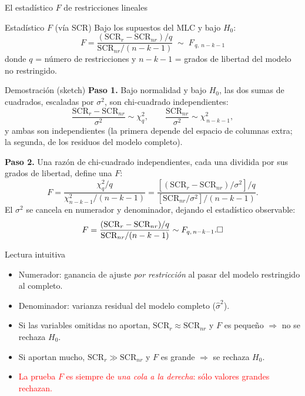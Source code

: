 \documentclass{beamer}
\begin{document}
\begin{frame}[allowframebreaks]{El estadístico $F$ de restricciones lineales}

\begin{alertblock}{Estadístico $F$ (vía SCR)}
Bajo los supuestos del MLC y bajo $H_0$:
\[
\boxed{\,F = \frac{(\text{SCR}_r - \text{SCR}_{nr})/q}{\text{SCR}_{nr}/(n-k-1)} \;\sim\; F_{\,q,\ n-k-1}\,}
\]
donde $q$ = número de restricciones y $n-k-1$ = grados de libertad del modelo no restringido.
\end{alertblock}

\begin{exampleblock}{Demostración (sketch)}
\textbf{Paso 1.} Bajo normalidad y bajo $H_0$, las dos sumas de cuadrados, escaladas por $\sigma^2$, son chi-cuadrado independientes:
\[
\frac{\text{SCR}_r - \text{SCR}_{nr}}{\sigma^2} \sim \chi^2_{q},
\qquad
\frac{\text{SCR}_{nr}}{\sigma^2} \sim \chi^2_{\,n-k-1},
\]
y ambas son independientes (la primera depende del espacio de columnas extra; la segunda, de los residuos del modelo completo).

\framebreak

\textbf{Paso 2.} Una razón de chi-cuadrado independientes, cada una dividida por sus grados de libertad, define una $F$:
\[
F = \frac{\chi^2_q / q}{\chi^2_{n-k-1}/(n-k-1)}
  = \frac{[(\text{SCR}_r - \text{SCR}_{nr})/\sigma^2]/q}{[\text{SCR}_{nr}/\sigma^2]/(n-k-1)} .
\]
El $\sigma^2$ se cancela en numerador y denominador, dejando el estadístico observable:
\[
F = \frac{(\text{SCR}_r - \text{SCR}_{nr})/q}{\text{SCR}_{nr}/(n-k-1)} \sim F_{q,\,n-k-1}.
\hfill \square
\]
\end{exampleblock}

\framebreak

\begin{block}{Lectura intuitiva}
\begin{itemize}
    \item Numerador: ganancia de ajuste \emph{por restricción} al pasar del modelo restringido al completo.
    \item Denominador: varianza residual del modelo completo ($\hat{\sigma}^2$).
    \item Si las variables omitidas no aportan, $\text{SCR}_r \approx \text{SCR}_{nr}$ y $F$ es pequeño $\Rightarrow$ no se rechaza $H_0$.
    \item Si aportan mucho, $\text{SCR}_r \gg \text{SCR}_{nr}$ y $F$ es grande $\Rightarrow$ se rechaza $H_0$.
    \item \textcolor{red}{La prueba $F$ es siempre de \emph{una cola a la derecha}: sólo valores grandes rechazan.}
\end{itemize}
\end{block}
\end{frame}
\end{document}
